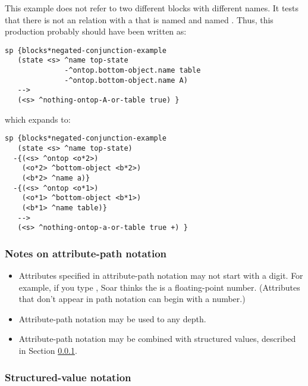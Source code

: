 This example does not refer to two different blocks with different names. It tests that there is not an  relation with a  that is named  and named . Thus, this production probably should have been written as:

\begin{verbatim}
sp {blocks*negated-conjunction-example
   (state <s> ^name top-state 
              -^ontop.bottom-object.name table
              -^ontop.bottom-object.name A)
   -->
   (<s> ^nothing-ontop-A-or-table true) }
\end{verbatim}

which expands to: 

\begin{verbatim}
sp {blocks*negated-conjunction-example
   (state <s> ^name top-state)
  -{(<s> ^ontop <o*2>)
    (<o*2> ^bottom-object <b*2>)
    (<b*2> ^name a)}
  -{(<s> ^ontop <o*1>)
    (<o*1> ^bottom-object <b*1>)
    (<b*1> ^name table)}
   -->
   (<s> ^nothing-ontop-a-or-table true +) }
\end{verbatim}

\subsubsection*{Notes on attribute-path notation}

\vspace{-12pt}
\begin{itemize}
	\item 
		Attributes specified in attribute-path notation may not start with a digit. For example, if you type , Soar thinks the  is a floating-point number. (Attributes that don't appear in path notation can begin with a number.)
		\vspace{-6pt}
	\item 
		Attribute-path notation may be used to any depth.
		\vspace{-6pt}
	\item 
		Attribute-path notation may be combined with structured values, described in Section \ref{SYNTAX-pm-lhs-structured}.
		\vspace{-6pt}
\end{itemize}


\subsubsection{Structured-value notation}
\label{SYNTAX-pm-lhs-structured}

